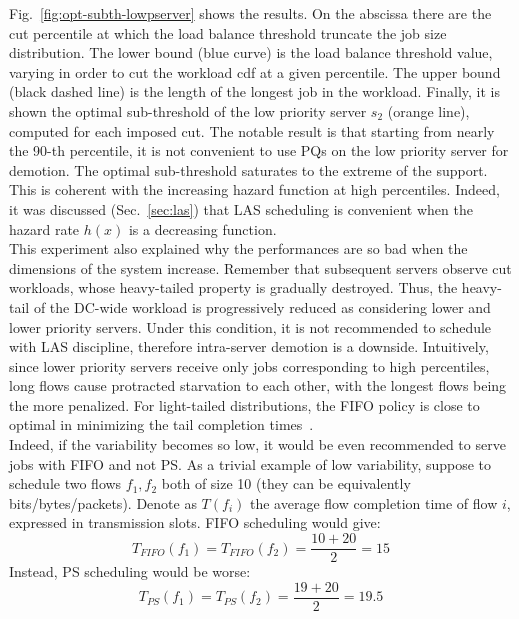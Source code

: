 Fig.~\ref{fig:opt-subth-lowpserver} shows the results. On the abscissa there are the cut percentile at which the load balance threshold truncate the job size distribution. The lower bound (blue curve) is the load balance threshold value, varying in order to cut the workload cdf at a given percentile.  The upper bound (black dashed line) is the length of the longest job in the workload. Finally, it is shown the optimal sub-threshold of the low priority server $s_2$ (orange line), computed for each imposed cut. The notable result is that starting from nearly the 90-th percentile, it is not convenient to use PQs on the low priority server for demotion. The optimal sub-threshold saturates to the extreme of the support. This is coherent with the increasing hazard function at high percentiles. Indeed, it was discussed (Sec.~\ref{sec:las}) that LAS scheduling is convenient when the hazard rate $h(x)$ is a decreasing function.\\
This experiment also explained why the performances are so bad when the dimensions of the system increase. Remember that subsequent servers observe cut workloads, whose heavy-tailed property is gradually destroyed. Thus, the heavy-tail of the DC-wide workload is progressively reduced as considering lower and lower priority servers. Under this condition, it is not recommended to schedule with LAS discipline, therefore intra-server demotion is a downside. Intuitively, since lower priority servers receive only jobs corresponding to high percentiles, long flows cause protracted starvation to each other, with the longest flows being the more penalized. For light-tailed distributions, the FIFO policy is close to optimal in minimizing the tail completion times~\cite{optimal-tail-scheduling}. \\
Indeed, if the variability becomes so low, it would be even recommended to serve jobs with FIFO and not PS. As a trivial example of low variability, suppose to schedule two flows $f_1, f_2$ both of size 10 (they can be equivalently bits/bytes/packets). Denote as $T(f_i)$ the average flow completion time of flow $i$, expressed in transmission slots. FIFO scheduling would give:
\[
	T_{FIFO}(f_1) = T_{FIFO}(f_2) = \dfrac{10+20}{2} = 15
\]
Instead, PS scheduling would be worse:
\[
T_{PS}(f_1) = T_{PS}(f_2) = \dfrac{19+20}{2} = 19.5
\]
